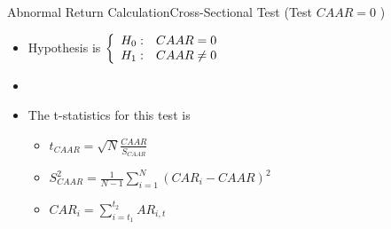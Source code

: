 \documentclass{beamer}
\begin{document}
	
	\begin{frame}{Abnormal Return Calculation}{Cross-Sectional Test (Test $ CAAR=0 $ )}
		
		\begin{itemize}
			\item Hypothesis is  $\left\{\begin{array}{c c }
				H_0: & CAAR=0\\
				H_1: & CAAR\neq 0
			\end{array}\right.
			$\\
			\item[]
			\item The t-statistics for this test is 
			\begin{itemize}
				\item 
				$
				t_{CAAR} = \sqrt{N}\frac{CAAR}{S_{CAAR}}
				$
				\item 
				$
				S^2_{CAAR} = \frac{1}{N-1}\sum_{i = 1}^{N}(CAR_i - {CAAR})^2
				$
				\item
				\scriptsize
				$ CAR_i = \sum_{i=t_1}^{t_2} AR_{i,t} $ 
				\normalsize 
			\end{itemize}
		\end{itemize}
		
	\end{frame}
	
	
	
\end{document}
